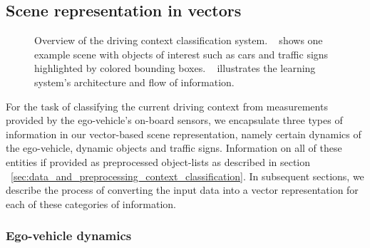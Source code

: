 \subsection{Scene representation in vectors}%
\label{subsec:scene_representation_in_vectors_context_classification}
\begin{figure}[t]
    \centering
    \caption{Overview of the driving context classification system.
    ~\protect{} shows one example scene with objects of interest such as cars and traffic signs highlighted by colored bounding boxes.
~\protect{} illustrates the learning system's architecture and flow of information.}
    \label{fig:context_class_sys_arch}
\end{figure}

For the task of classifying the current driving context from measurements provided by the ego-vehicle's on-board sensors, we encapsulate three types of information in our vector-based scene representation, namely certain dynamics of the ego-vehicle, dynamic objects and traffic signs.
Information on all of these entities if provided as preprocessed object-lists as described in section ~\ref{sec:data_and_preprocessing_context_classification}.
In subsequent sections, we describe the process of converting the input data into a vector representation for each of these categories of information.

\subsubsection{Ego-vehicle dynamics}
\label{subsubsec:ego-veh-dyn}

